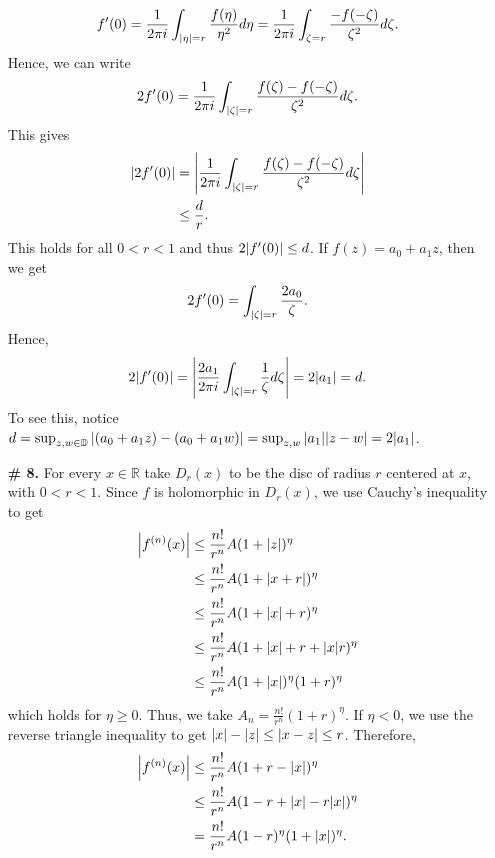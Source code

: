 \documentclass[a4paper,12pt]{article} %
\theoremstyle{plain}
\theoremstyle{definition}
\newcommand{\R}{\mathbb{R}}
\begin{document}
\begin{enumerate}
     \begin{align*}
       f'(0) = \frac{1}{2\pi i} \int_{\abs{\eta} = r} \frac{f(\eta)}{\eta^2} d\eta = \frac{1}{2 \pi i} \int_{\zeta = r} \frac{-f(-\zeta)}{\zeta^2} d \zeta.
     \end{align*}
     Hence, we can write
     \begin{align*}
       2 f'(0) = \frac{1}{2 \pi i} \int_{\abs{\zeta} = r} \frac{f(\zeta) - f(-\zeta)}{\zeta^2} d \zeta.
     \end{align*}
     This gives
     \begin{align*}
       \abs{2 f'(0)} &= \abs{\frac{1}{2 \pi i} \int_{\abs{\zeta} = r} \frac{f(\zeta) - f(-\zeta)}{\zeta^2} d \zeta} \\
                     &\le  \frac{d}{r}.
     \end{align*}
     This holds for all $0 < r < 1$ and thus $2\abs{f'(0)} \le d$.  If $f(z) = a_0 + a_1z$, then we get
     \begin{align*}
       2 f'(0) = \int_{\abs{\zeta} = r} \frac{2a_0}{\zeta}.
     \end{align*}
     Hence,
     \begin{align*}
       2 \abs{f'(0)} = \abs{\frac{2a_1}{2\pi i} \int_{\abs{\zeta} = r} \frac{1}{\zeta} d \zeta} = 2\abs{a_1} = d. 
     \end{align*}
     To see this, notice $d = \sup_{z,w \in \mathbb{D}} \abs{(a_0 + a_1 z) - (a_0 + a_1 w)} = \sup_{z,w} \abs{a_1}\abs{z-w} = 2 \abs{a_1}$.



   \item[\textbf{\# 8.}]  For every $x \in \R$ take $D_r(x)$ to be the disc of radius $r$ centered at $x$, with $0 < r < 1$.  Since $f$ is holomorphic in $D_r(x)$, we use Cauchy's inequality to get
     \begin{align*}
       \abs{f^{(n)}(x)} &\le \frac{n!}{r^{n}} A(1+\abs{z})^{\eta} \\
       &\le \frac{n!}{r^{n}} A(1 + \abs{x + r})^{\eta} \\
       &\le \frac{n!}{r^{n}} A(1 + \abs{x} + r)^{\eta} \\
       &\le \frac{n!}{r^{n}} A(1 + \abs{x} + r + \abs{x}r)^{\eta} \\
       &\le \frac{n!}{r^{n}} A(1 + \abs{x})^{\eta}(1 + r)^{\eta} \\
     \end{align*}
   which holds for $\eta \ge 0$.  Thus, we take $A_n = \frac{n!}{r^{n}} (1+r)^{\eta}$.  If $\eta < 0$, we use the reverse triangle inequality to get $\abs{x} - \abs{z} \le  \abs{x-z} \le  r$.  Therefore,
   \begin{align*}
     \abs{f^{(n)}(x)} &\le  \frac{n!}{r^{n}} A(1 + r - \abs{x})^{\eta} \\
                      &\le  \frac{n!}{r^{n}} A(1 - r + \abs{x} - r\abs{x})^{\eta} \\
                      &= \frac{n!}{r^{n}} A(1-r)^{\eta}(1 + \abs{x})^\eta.
   \end{align*}
   

\end{enumerate}
\end{document}

